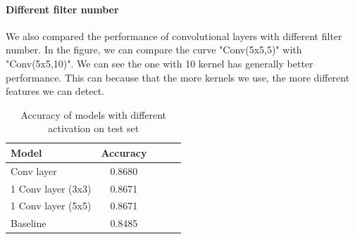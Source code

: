 \documentclass{article}
\begin{document}
\paragraph{Different filter number}
We also compared the performance of convolutional layers with different filter number. In the figure, we can compare the curve "Conv(5x5,5)" with "Conv(5x5,10)". We can see the one with 10 kernel has generally better performance. This can because that the more kernels we use, the more different features we can detect.





\begin{table}[tb]
\vskip 3mm
\begin{center}
\begin{small}
\begin{sc}
\begin{tabular}{lcccr}
\hline
\abovespace\belowspace
Model & Accuracy \\
\hline
\abovespace
2 Conv layer    	& 0.8680 	\\
1 Conv layer (3x3)	 	& 0.8671 	\\
1 Conv layer (5x5)	 	& 0.8671 	\\

Baseline				  	& 0.8485 	\\

\hline
\end{tabular}
\end{sc}
\end{small}
\caption{Accuracy of models with different activation on test set}
\label{tab:cnn}
\end{center}
\vskip -3mm
\end{table}



\end{document}
